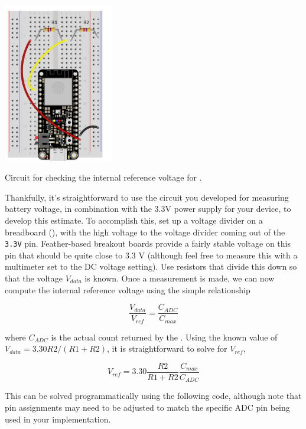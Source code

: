 \begin{marginfigure}[-5cm]
	\begin{center}
		\includegraphics[height=7cm]{Images/check_vref2.png}
		\caption[Checking reference voltage]{Circuit for checking the internal reference voltage for \adc.}
	\end{center}
\end{marginfigure}

Thankfully, it's straightforward to use the circuit you developed for measuring battery voltage, in combination with the 3.3V power supply for your device, to develop this estimate. To accomplish this, set up a voltage divider on a breadboard (), with the high voltage to the voltage divider coming out of the \texttt{3.3V} pin. Feather-based breakout boards provide a fairly stable voltage on this pin that should be quite close to \num{3.3} \si{\volt} (although feel free to measure this with a multimeter set to the DC voltage setting).  Use resistors that divide this down so that the voltage $V_{data}$ is known.  Once a measurement is made, we can now compute the internal reference voltage using the simple relationship

	\begin{equation}\label{voltage_ratio}
		\frac{V_{data}}{V_{ref}} = \frac{C_{ADC}}{C_{max}}
	\end{equation}

where $C_{ADC}$ is the actual count returned by the \adc. Using the known value of $V_{data}=3.30 R2/(R1+R2)$, it is straightforward to solve for $V_{ref}$,

	\begin{equation}\label{vref}
		V_{ref} = 3.30\frac{R2}{R1+R2}\frac{C_{max}}{C_{ADC}}
	\end{equation}

This can be solved programmatically using the following code, although note that pin assignments may need to be adjusted to match the specific ADC pin being used in your implementation.

